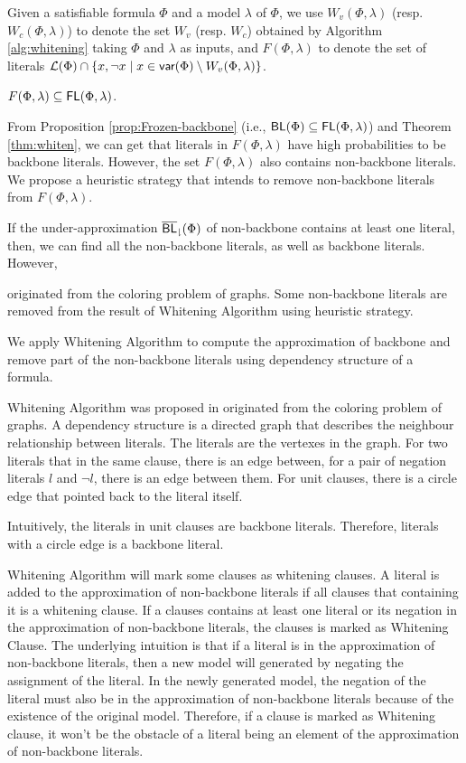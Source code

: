 Given a satisfiable formula $\Phi$ and a model $\lambda$ of $\Phi$, we use $W_v(\Phi,\lambda)$ (resp. $W_c(\Phi,\lambda)$) to denote the set
$W_v$ (resp. $W_c$) obtained by Algorithm \ref{alg:whitening} taking $\Phi$ and $\lambda$ as inputs, and
$F(\Phi,\lambda)$ to denote the set of literals ${\cal L}(\Phi)\cap \{x,\neg x\mid x\in \textsf{var}(\Phi)\setminus W_v(\Phi,\lambda)\}$.



\begin{theorem}\cite{LMZ09}
\label{thm:whiten}
$F(\Phi,\lambda)\subseteq\textsf{FL}(\Phi,\lambda)$.
\end{theorem}

From Proposition \ref{prop:Frozen-backbone} (i.e., $\textsf{BL}(\Phi)\subseteq\textsf{FL}(\Phi,\lambda)$) and Theorem \ref{thm:whiten}, 
we can get that literals in $F(\Phi,\lambda)$ have high probabilities to be backbone literals. However, the set $F(\Phi,\lambda)$ also contains non-backbone literals. We propose a heuristic strategy that intends to remove non-backbone literals from $F(\Phi,\lambda)$.




If the under-approximation ${\sf \overline{BL}_\downharpoonright}(\Phi)$ of non-backbone contains at least one literal,
then, we can find all the non-backbone literals, as well as backbone literals.
However,




 originated from the coloring problem of graphs. Some non-backbone literals are removed from the result of Whitening Algorithm using heuristic strategy.


 We apply Whitening Algorithm to compute the approximation of backbone and remove part of the non-backbone literals using dependency structure of a formula.

 Whitening Algorithm was proposed in \cite{CJG2001} originated from the coloring problem of graphs. A dependency structure is a directed graph that describes the neighbour relationship between literals. The literals are the vertexes in the graph. For two literals that in the same clause, there is an edge between, for a pair of negation literals $l$ and $\neg l$, there is an edge between them. For unit clauses, there is a circle edge that pointed back to the literal itself.

 Intuitively, the literals in unit clauses are backbone literals. Therefore, literals with a circle edge is a backbone literal.

 Whitening Algorithm will mark some clauses as whitening clauses. A literal is added to the approximation of non-backbone literals if all clauses that containing it is a whitening clause. If a clauses contains at least one literal or its negation in the approximation of non-backbone literals, the clauses is marked as Whitening Clause. The underlying intuition is that if a literal is in the approximation of non-backbone literals, then a new model will generated by negating the assignment of the literal. In the newly generated model, the negation of the literal must also be in the approximation of non-backbone literals because of the existence of the original model. Therefore, if a clause is marked as Whitening clause, it won't be the obstacle of a literal being an element of the approximation of non-backbone literals.

